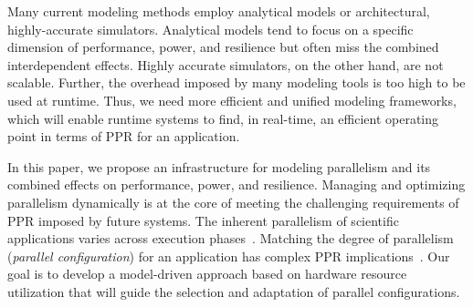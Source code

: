 \documentclass{article}  %
\begin{document}
Many current modeling methods employ analytical models or architectural, 
highly-accurate simulators. Analytical models tend to focus on a specific 
dimension of performance, power, and resilience but often miss the combined 
interdependent effects. Highly accurate simulators, on the other hand, are 
not scalable. Further, the overhead imposed by many modeling tools is too 
high to be used at runtime. Thus, we need more efficient and unified modeling
frameworks, which will enable runtime systems to find, in real-time, an
efficient operating point in terms of PPR for an application. 



In this paper, we propose an infrastructure for modeling parallelism
and its combined effects on performance, power, and resilience. Managing 
and optimizing parallelism dynamically is at the core of meeting the 
challenging requirements of PPR imposed by future systems. The inherent 
parallelism of scientific applications varies across execution 
phases~\cite{nvram_ipdps12}.  Matching the degree of parallelism 
(\textit{parallel configuration}) for an application has complex PPR 
implications~\cite{mpiopenmp_ipdps10, mpiopenmp_tpds13, dsn_pact08, dsn_ics06}.
Our goal is to develop a model-driven approach based on hardware resource 
utilization that will guide the selection and adaptation of parallel 
configurations.





\end{document}
